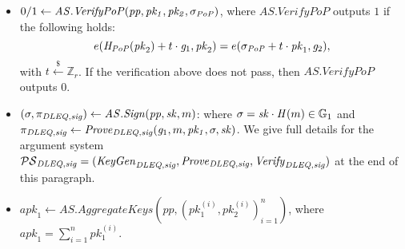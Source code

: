 \begin{construction}
\begin{itemize}

\item $0/1 \leftarrow \mathit{AS.VerifyPoP}(\mathit{pp}, \mathit{pk_1}, \mathit{pk_2}, \sigma_{\mathit{PoP}})$, 
where $\mathit{AS.VerifyPoP}$ outputs $1$ if the following holds:
$$e(\mathit{H}_{\mathit{PoP}}(\mathit{pk}_2) + t \cdot \mathit{g}_{1}, \mathit{pk}_2) = e(\sigma_{\mathit{PoP}} + t \cdot \mathit{pk}_1, \mathit{g}_{2}),$$
\noindent with $t \xleftarrow{\$} \mathbb{Z}_r$. If the verification above does not pass, 
then $\mathit{AS.VerifyPoP}$ outputs $0$.


\item $(\sigma, \pi_{\mathit{DLEQ}, \mathit{sig}}) \leftarrow \mathit{AS.Sign}(\mathit{pp}, \mathit{sk}, m)$: 
where $\sigma = \mathit{sk} \cdot \mathit{H}(m) \in \mathbb{G}_{1}$ and $ \pi_{\mathit{DLEQ}, \mathit{sig}} \leftarrow \mathit{Prove}_{\mathit{DLEQ}, \mathit{sig}}(\mathit{g}_{1}, m, \mathit{pk_1}, \sigma, \mathit{sk})$. We 
give full details for the argument system $\mathcal{PS}_{\mathit{DLEQ}, \mathit{sig}} = (\mathit{KeyGen}_{\mathit{DLEQ}, \mathit{sig}}, \mathit{Prove}_{\mathit{DLEQ}, \mathit{sig}}, \\ \mathit{Verify}_{\mathit{DLEQ}, \mathit{sig}})$ at the end of this paragraph.


\item $\mathit{apk}_1 \leftarrow \mathit{AS.AggregateKeys}(\mathit{pp}, (\mathit{pk_1^{(i)}}, \mathit{pk_2^{(i)}})_{i=1}^{n})$, 
where $\mathit{apk}_1 = \sum_{i=1}^{n} \mathit{pk_1^{(i)}}$. 



\end{itemize}
\end{construction}
